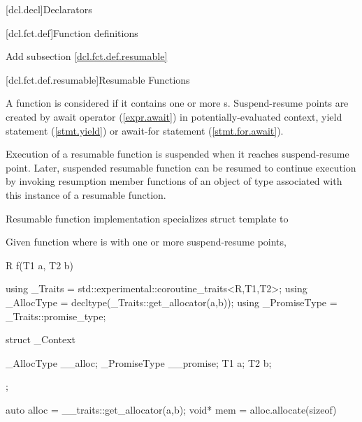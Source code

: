 
[dcl.decl]{Declarators}

\setcounter{section}{3}
[dcl.fct.def]{Function definitions}

Add subsection \ref{dcl.fct.def.resumable}

\setcounter{subsection}{3}
[dcl.fct.def.resumable]{Resumable Functions}

\pnum
A function is considered  if it contains
one or more s. 
Suspend-resume points are created by await operator (\ref{expr.await}) in potentially-evaluated context, yield statement (\ref{stmt.yield}) 
or await-for statement (\ref{stmt.for.await}).

\pnum
Execution of a resumable function is suspended when it reaches suspend-resume point.
Later, suspended resumable function can be resumed
to continue execution by invoking
resumption member functions of an object of  type
associated with this instance of a resumable function. 


\pnum 
Resumable function implementation specializes struct template  to 


\pnum Given function  where  is  with one or more suspend-resume points, 

\begin{codeblock}
R f(T1 a, T2 b) {
  using _Traits = std::experimental::coroutine_traits<R,T1,T2>;
  using _AllocType = decltype(_Traits::get_allocator(a,b));  
  using _PromiseType = _Traits::promise_type;  
  
  struct _Context {
  	_AllocType   __alloc;
  	_PromiseType __promise;
  	T1 a;
  	T2 b;
  	
  	
  	
  };
  
  auto alloc = __traits::get_allocator(a,b);
  void* mem = alloc.allocate(sizeof)
  
}
\end{codeblock}
